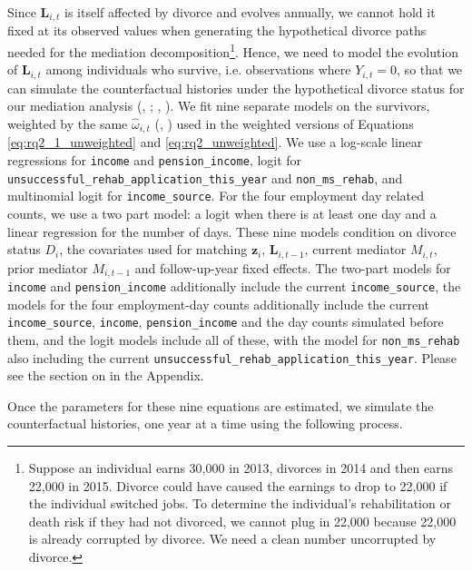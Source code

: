 \documentclass[a4paper,12pt]{article}
\theoremstyle{plain}
\theoremstyle{definition}
\theoremstyle{TheoremNum}
\theoremstyle{CorollaryNum}
\theoremstyle{PropositionNum}
\theoremstyle{TheoremNum}
\begin{document}
Since $\mathbf{L}_{i,t}$ is itself affected by divorce and evolves annually, we cannot hold it fixed at its observed values when generating the hypothetical divorce paths needed for the mediation decomposition\footnote{Suppose an individual earns 30,000 in 2013, divorces in 2014 and then earns 22,000 in 2015. Divorce could have caused the earnings to drop to 22,000 if the individual switched jobs. To determine the individual's rehabilitation or death risk if they had not divorced, we cannot plug in 22,000 because 22,000 is already corrupted by divorce. We need a clean number uncorrupted by divorce.}. Hence, we need to model the evolution of $\mathbf{L}_{i,t}$ among individuals who survive, i.e. observations where $Y_{i,t}=0$, so that we can simulate the counterfactual histories under the hypothetical divorce status for our mediation analysis (\citeauthor{robins1986}, \citeyear{robins1986}; \citeauthor*{lin2017survival}, \citeyear{lin2017survival}). We fit nine separate models on the survivors, weighted by the same $\hat{\omega}_{i,t}$ (\citeauthor*{lin2017epi}, \citeyear{lin2017epi}) used in the weighted versions of Equations \ref{eq:rq2_1_unweighted} and \ref{eq:rq2_unweighted}. We use a log-scale linear regressions for \texttt{income} and \texttt{pension\_income}, logit for \texttt{unsuccessful\_rehab\_application\_this\_year} and \texttt{non\_ms\_rehab}, and multinomial logit for \texttt{income\_source}. For the four employment day related counts, we use a two part model: a logit when there is at least one day and a linear regression for the number of days. These nine models condition on divorce status $D_i$, the covariates used for matching $\mathbf{z}_i$, $\mathbf{L}_{i,t-1}$, current mediator $M_{i,t}$, prior mediator $M_{i,t-1}$ and follow-up-year fixed effects. The two-part models for \texttt{income} and \texttt{pension\_income} additionally include the current \texttt{income\_source}, the models for the four employment-day counts additionally include the current \texttt{income\_source}, \texttt{income}, \texttt{pension\_income} and the day counts simulated before them, and the logit models include all of these, with the model for \texttt{non\_ms\_rehab} also including the current \texttt{unsuccessful\_rehab\_application\_this\_year}. Please see the section on  in the Appendix.

Once the parameters for these nine equations are estimated, we simulate the counterfactual histories, one year at a time using the following process. 
\end{document}

